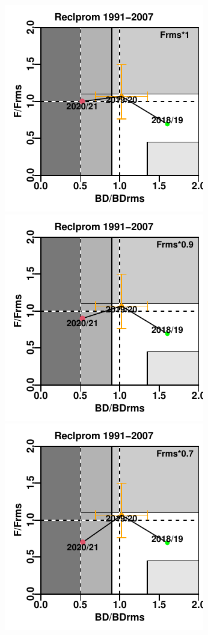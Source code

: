 \documentclass[
  spanish,
]{article}
\begin{document}
\pagebreak

\includegraphics{FigurasInforme_Marzo/Fig44a_sept-1.pdf}
\includegraphics{FigurasInforme_Marzo/Fig44a_sept-2.pdf}
\includegraphics{FigurasInforme_Marzo/Fig44a_sept-3.pdf}
\end{document}
